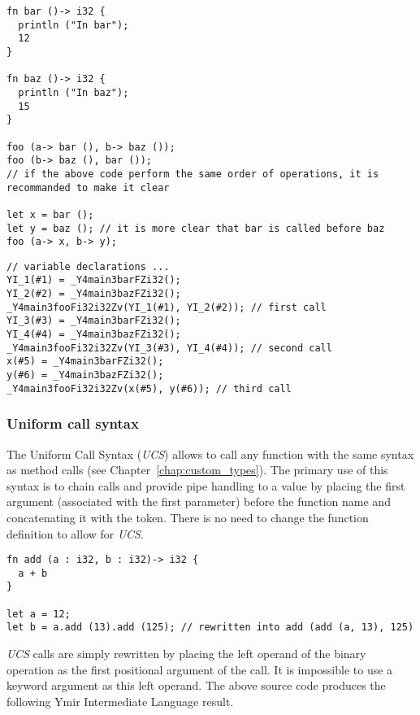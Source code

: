\begin{lstlisting}[style=coloredverbatim]
fn bar ()-> i32 {
  println ("In bar");
  12
}

fn baz ()-> i32 {
  println ("In baz");
  15
}

foo (a-> bar (), b-> baz ());
foo (b-> baz (), bar ());
// if the above code perform the same order of operations, it is recommanded to make it clear

let x = bar ();
let y = baz (); // it is more clear that bar is called before baz
foo (a-> x, b-> y);
\end{lstlisting}
\smallskip

\begin{lstlisting}[style=intermediateVerb]
// variable declarations ...
YI_1(#1) = _Y4main3barFZi32();
YI_2(#2) = _Y4main3bazFZi32();
_Y4main3fooFi32i32Zv(YI_1(#1), YI_2(#2)); // first call
YI_3(#3) = _Y4main3barFZi32();
YI_4(#4) = _Y4main3bazFZi32();
_Y4main3fooFi32i32Zv(YI_3(#3), YI_4(#4)); // second call
x(#5) = _Y4main3barFZi32();
y(#6) = _Y4main3bazFZi32();
_Y4main3fooFi32i32Zv(x(#5), y(#6)); // third call
\end{lstlisting}

\subsubsection*{Uniform call syntax}

The Uniform Call Syntax (\textit{UCS}) allows to call any function with the same
syntax as method calls (see Chapter~\ref{chap:custom_types}). The primary use of
this syntax is to chain calls and provide pipe handling to a value by placing
the first argument (associated with the first parameter) before the function
name and concatenating it with the  token. There is no need to change
the function definition to allow for \textit{UCS}.

\begin{lstlisting}[style=coloredverbatim]
fn add (a : i32, b : i32)-> i32 {
  a + b
}

let a = 12;
let b = a.add (13).add (125); // rewritten into add (add (a, 13), 125)
\end{lstlisting}

\textit{UCS} calls are simply rewritten by placing the left operand of the
binary operation  as the first positional argument of the call. It is
impossible to use a keyword argument as this left operand. The above source code
produces the following Ymir Intermediate Language result.
\smallskip

